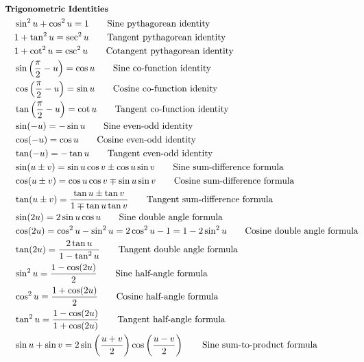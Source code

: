 \documentclass[10pt]{article}
\newcommand{\lrp}[1]{\left( #1 \right)}
\begin{document}
\begin{multicols}{2}
	\tiny
	\setlength{\abovedisplayskip}{-25pt}
	\setlength{\belowdisplayskip}{0pt}
	\setlength{\abovedisplayshortskip}{0pt}
	\setlength{\belowdisplayshortskip}{0pt}
	\begin{align*}
	& \small \hspace{-10pt} \textbf{Trigonometric Identities} \small \\
		& \sin^2 u + \cos^2 u = 1	\tag*{Sine pythagorean identity} \\
		& 1 + \tan^2 u = \sec^2 u 	\tag*{Tangent pythagorean identity} \\
		& 1 + \cot^2 u = \csc^2 u 	\tag*{Cotangent pythagorean identity} \\
		& \sin \lrp{\frac{\pi}{2} - u} = \cos u	\tag*{Sine co-function identity} \\
		& \cos \lrp{\frac{\pi}{2} - u} = \sin u	\tag*{Cosine co-function idenity} \\
		& \tan \lrp{\frac{\pi}{2} - u} = \cot u	\tag*{Tangent co-function identity} \\
		& \sin(-u) = -\sin u	\tag*{Sine even-odd identity} \\
		& \cos(-u) = \cos u		\tag*{Cosine even-odd identity} \\
		& \tan(-u) = -\tan u	\tag*{Tangent even-odd identity} \\
		& \sin(u \pm v) = \sin u \cos v \pm \cos u \sin v	\tag*{Sine sum-difference formula} \\
		& \cos(u \pm v) = \cos u \cos v \mp \sin u \sin v	\tag*{Cosine sum-difference formula} \\
		& \tan(u \pm v) = \frac{\tan u \pm \tan v}{1 \mp \tan u \tan v}	\tag*{Tangent sum-difference formula} \\
		& \sin(2 u) = 2 \sin u \cos u	\tag*{Sine double angle formula} \\
		& \cos (2 u) = \cos^2 u - \sin^2 u = 2 \cos^2 u - 1 = 1 - 2 \sin^2 u	\tag*{Cosine double angle formula} \\
		& \tan (2 u) = \frac{2 \tan u}{1 - \tan^2 u}	\tag*{Tangent double angle formula} \\
		& \sin^2 u =\frac{1- \cos (2u)}{2}	\tag*{Sine half-angle formula} \\
		& \cos^2 u =\frac{1 + \cos(2 u)}{2}	\tag*{Cosine half-angle formula} \\
		& \tan^2 u = \frac{1 - \cos (2u)}{1+\cos (2u)}	\tag*{Tangent half-angle formula} \\
		& \sin u + \sin v = 2 \sin \lrp{\frac{u+v}{2}} \cos \lrp{\frac{u-v}{2}}	\tag*{Sine sum-to-product formula} \\

\end{align*}
\end{multicols}
\end{document}
